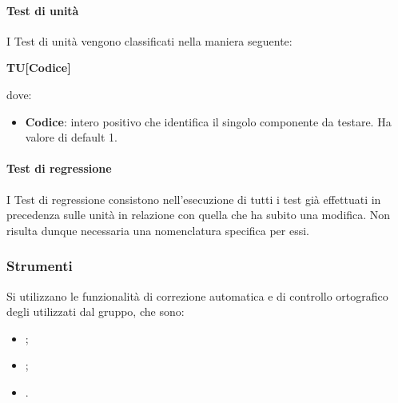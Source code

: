 		\paragraph{Test di unità}
		I Test di unità vengono classificati nella maniera seguente:
		\begin{center}
			\textbf{TU[Codice]}
		\end{center}		
		dove:\\
		\begin{itemize}
			\item \textbf{Codice}: intero positivo che identifica il singolo componente da testare. Ha valore di default 1.
		\end{itemize}
		
		\paragraph{Test di regressione}
		I Test di regressione consistono nell'esecuzione di tutti i test già effettuati in precedenza sulle unità in relazione con quella che ha subito una modifica. Non risulta dunque necessaria una nomenclatura specifica per essi.
		
		\subsubsection{Strumenti}
		Si utilizzano le funzionalità di correzione automatica e di controllo ortografico degli  utilizzati dal gruppo, che sono:
		\begin{itemize}
			\item {};
			\item {};
			\item {}.
		\end{itemize}
